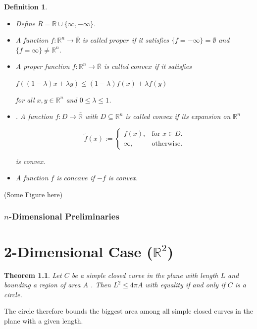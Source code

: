 \documentclass[a4paper]{book}
\newtheorem{theorem}{Theorem}%
\newtheorem{definition}[theorem]{Definition}%
\numberwithin{theorem}{section}%
\begin{document}
\begin{definition}
	\begin{itemize}
		\item Define $\bar{R}=\mathbb{R}\cup\{ \infty,-\infty\}$.
		\item A function $f:\mathbb{R}^n\to\bar{\mathbb{R}}$ is called $proper$ if it satisfies $\{f=-\infty\}=\emptyset$ and $\{f=\infty\}\neq\mathbb{R}^n$.
		\item A proper function $f:\mathbb{R}^n\to\bar{\mathbb{R}}$ is called $convex$ if it satisfies 
		\begin{center}
			$\displaystyle f((1-\lambda)x+\lambda y)\leq(1-\lambda)f(x)+\lambda f(y)$
		\end{center}
		for all $x, y\in\mathbb{R}^n$ and $0\leq\lambda\leq1$.
		\item . A function $f:D\to\bar{\mathbb{R}}$ with $D\subseteq\mathbb{R}^n$ is called convex if its expansion on $\mathbb{R}^n$
		\begin{center}
			\begin{equation}
				  \tilde{f}(x):=\begin{cases}
				    	f(x), & \text{for $x\in D$}.\\
				   	 \infty, & \text{otherwise}.
				  \end{cases}
			\end{equation}
		\end{center}
		is convex.
		\item A function $f$ is $concave$ if $-f$ is convex.
	\end{itemize}
\end{definition}
(Some Figure here)

\subsection{$n$-Dimensional Preliminaries}

\chapter{2-Dimensional Case ($\mathbb{R}^2$)}
\begin{theorem}
    Let $C$ be a simple closed curve in the plane with length $L$ and bounding a region of area $A$ . 
    Then $L^2 \leq 4\pi A$ with equality if and only if $C$ is a circle.
\end{theorem}
The circle therefore bounds the biggest area among all simple closed curves in the plane with a given length.
\end{document}
